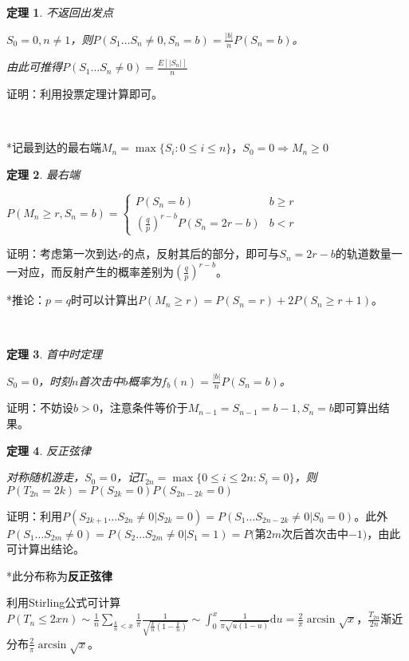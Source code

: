\documentclass[a4paper,UTF8,fontset=windows]{ctexart}
\newtheorem{thm}{定理}[section]
\begin{document}
\begin{thm} 不返回出发点

$S_0=0,n\neq1$，则$P(S_1\dots S_n\neq 0,S_n=b)=\frac{|b|}{n}P(S_n=b)$。

由此可推得$P(S_1\dots S_n\neq0)=\frac{E[|S_n|]}{n}$
\end{thm}

证明：利用投票定理计算即可。

~

*记最到达的最右端$M_n=\max\{S_i:0\le i\le n\}$，$S_0=0\Rightarrow M_n\ge0$

\begin{thm} 最右端

$P(M_n\ge r,S_n=b)=\begin{cases}P(S_n=b)&b\ge  r\\\left(\frac{q}{p}\right)^{r-b}P(S_n=2r-b)&b<r\end{cases}$
\end{thm}

证明：考虑第一次到达$r$的点，反射其后的部分，即可与$S_n=2r-b$的轨道数量一一对应，而反射产生的概率差别为$\left(\frac{q}{p}\right)^{r-b}$。

*推论：$p=q$时可以计算出$P(M_n\ge r)=P(S_n=r)+2P(S_n\ge r+1)$。

~

\begin{thm} 首中时定理

$S_0=0$，时刻$n$首次击中$b$概率为$f_b(n)=\frac{|b|}{n}P(S_n=b)$。
\end{thm}

证明：不妨设$b>0$，注意条件等价于$M_{n-1}=S_{n-1}=b-1,S_n=b$即可算出结果。

\begin{thm} 反正弦律
	
对称随机游走，$S_0=0$，记$T_{2n}=\max\{0\le i\le2n:S_i=0\}$，则$P(T_{2n}=2k)=P(S_{2k}=0)P(S_{2n-2k}=0)$
\end{thm}

证明：利用$P(S_{2k+1}\dots S_{2n}\neq0|S_{2k}=0)=P(S_1\dots S_{2n-2k}\neq0|S_0=0)$。此外$P(S_1\dots S_{2m}\neq0)=P(S_2\dots S_{2m}\neq0|S_1=1)=P($第$2m$次后首次击中$-1)$，由此可计算出结论。

*此分布称为\textbf{反正弦律}

利用Stirling公式可计算$P(T_n\le2xn)\sim\frac{1}{n}\sum_{\frac{k}{n}<x}\frac{1}{\pi}\frac{1}{\sqrt{\frac{k}{n}(1-\frac{k}{n})}}\sim\int_0^x\frac{1}{\pi\sqrt{u(1-u)}}\mathrm{d}u=\frac{2}{\pi}\arcsin\sqrt{x}$，$\frac{T_{2n}}{2n}$渐近分布$\frac{2}{\pi}\arcsin\sqrt{x}$。
\end{document}
